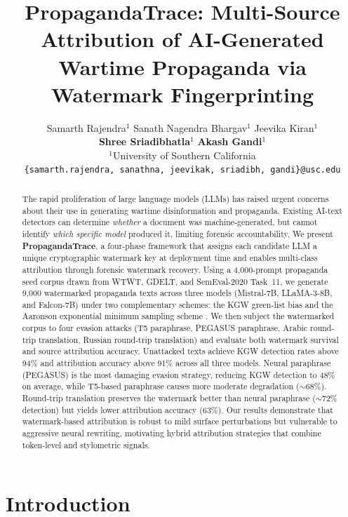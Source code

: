 \documentclass[11pt]{article}
\title{PropagandaTrace: Multi-Source Attribution of AI-Generated\\
Wartime Propaganda via Watermark Fingerprinting}
\author{
  Samarth Rajendra$^{1}$\quad
  Sanath Nagendra Bhargav$^{1}$\quad
  Jeevika Kiran$^{1}$ \\
  \textbf{Shree Sriadibhatla}$^{1}$\quad
  \textbf{Akash Gandi}$^{1}$ \\[4pt]
  $^{1}$University of Southern California \\
  \texttt{\{samarth.rajendra, sanathna, jeevikak, sriadibh, gandi\}@usc.edu}
}
\begin{document}
\maketitle

\begin{abstract}
The rapid proliferation of large language models (LLMs) has raised urgent
concerns about their use in generating wartime disinformation and propaganda.
Existing AI-text detectors can determine \emph{whether} a document was
machine-generated, but cannot identify \emph{which specific model} produced it,
limiting forensic accountability.
We present \textbf{PropagandaTrace}, a four-phase framework that assigns
each candidate LLM a unique cryptographic watermark key at deployment time
and enables multi-class attribution through forensic watermark recovery.
Using a 4{,}000-prompt propaganda seed corpus drawn from WTWT, GDELT, and
SemEval-2020 Task~11, we generate 9{,}000 watermarked propaganda texts across
three models (Mistral-7B, LLaMA-3-8B, and Falcon-7B) under two complementary
schemes: the KGW green-list bias \cite{kirchenbauer2023watermark} and the
Aaronson exponential minimum sampling scheme \cite{aaronson2022watermark}.
We then subject the watermarked corpus to four evasion attacks (T5 paraphrase,
PEGASUS paraphrase, Arabic round-trip translation, Russian round-trip
translation) and evaluate both watermark survival and source attribution
accuracy.
Unattacked texts achieve KGW detection rates above 94\% and attribution
accuracy above 91\% across all three models.
Neural paraphrase (PEGASUS) is the most damaging evasion strategy, reducing
KGW detection to 48\% on average, while T5-based paraphrase causes more
moderate degradation ($\sim$68\%).
Round-trip translation preserves the watermark better than neural paraphrase
($\sim$72\% detection) but yields lower attribution accuracy (63\%).
Our results demonstrate that watermark-based attribution is robust to mild
surface perturbations but vulnerable to aggressive neural rewriting, motivating
hybrid attribution strategies that combine token-level and stylometric signals.
\end{abstract}

\section{Introduction}
\label{sec:intro}
\end{document}
